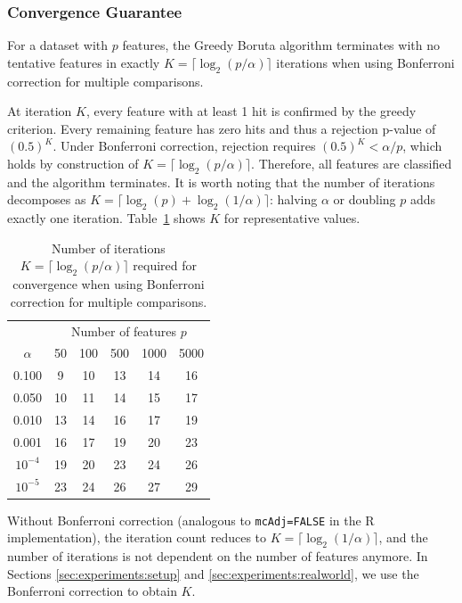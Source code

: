 \documentclass[runningheads]{llncs}
\begin{document}
\subsubsection{Convergence Guarantee}

\begin{theorem}
\label{thm:convergence}
For a dataset with $p$ features, the Greedy Boruta algorithm terminates with no tentative features in exactly $K = \lceil \log_2(p/\alpha) \rceil$ iterations when using Bonferroni correction for multiple comparisons.
\end{theorem}

At iteration $K$, every feature with at least 1 hit is confirmed by the greedy criterion. Every remaining feature has zero hits and thus a rejection p-value of $(0.5)^K$. Under Bonferroni correction, rejection requires $(0.5)^K < \alpha/p$, which holds by construction of $K = \lceil \log_2(p/\alpha) \rceil$. Therefore, all features are classified and the algorithm terminates. It is worth noting that the number of iterations decomposes as $K = \lceil \log_2(p) + \log_2(1/\alpha) \rceil$: halving $\alpha$ or doubling $p$ adds exactly one iteration. Table~\ref{tab:iterations_alpha} shows $K$ for representative values.

\begin{table}[H]
\centering
\caption{Number of iterations $K = \lceil \log_2(p/\alpha) \rceil$ required for convergence when using Bonferroni correction for multiple comparisons.}
\label{tab:iterations_alpha}
\begin{tabular}{c|ccccc}
\toprule
& \multicolumn{5}{c}{Number of features $p$} \\
$\alpha$ & 50 & 100 & 500 & 1000 & 5000 \\
\midrule
0.100 & 9 & 10 & 13 & 14 & 16 \\
0.050 & 10 & 11 & 14 & 15 & 17 \\
0.010 & 13 & 14 & 16 & 17 & 19 \\
0.001 & 16 & 17 & 19 & 20 & 23 \\
$10^{-4}$ & 19 & 20 & 23 & 24 & 26 \\
$10^{-5}$ & 23 & 24 & 26 & 27 & 29 \\
\bottomrule
\end{tabular}
\end{table}

\noindent Without Bonferroni correction (analogous to \texttt{mcAdj=FALSE} in the R implementation), the iteration count reduces to $K = \lceil \log_2(1/\alpha) \rceil$, and the number of iterations is not dependent on the number of features anymore. In Sections \ref{sec:experiments:setup} and \ref{sec:experiments:realworld}, we use the Bonferroni correction to obtain $K$. 
\end{document}
